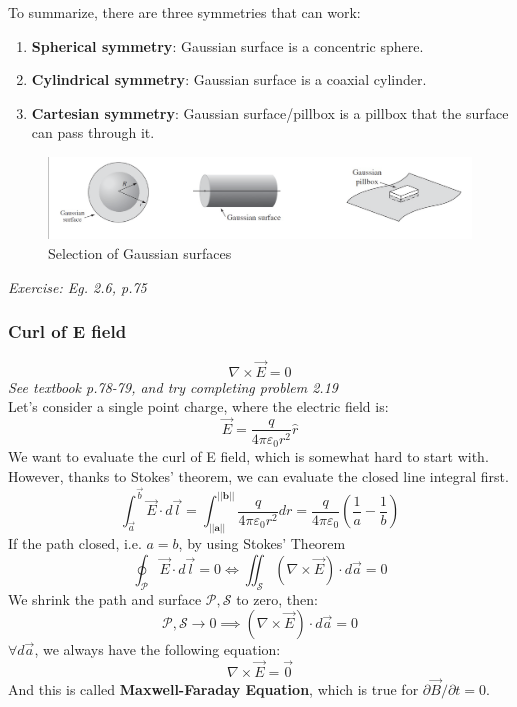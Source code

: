 \documentclass[12pt,a4paper,twoside]{article}
\numberwithin{equation}{section}
\begin{document}
    To summarize, there are three symmetries that can work:
    \begin{enumerate}
        \item \textbf{Spherical symmetry}: Gaussian surface is a concentric sphere.
        \item \textbf{Cylindrical symmetry}: Gaussian surface is a coaxial cylinder.
        \item \textbf{Cartesian symmetry}: Gaussian surface/pillbox is a pillbox that the surface can pass through it.
    \end{enumerate}
    \begin{figure}[ht]
        \centering
        \includegraphics[width=15cm]{250-Revision/gaussian-surfaces.png}
        \caption{Selection of Gaussian surfaces}
        \label{fig:gaussian-surfaces}
    \end{figure}
    \textit{Exercise: Eg. 2.6, p.75}
    
\subsubsection{Curl of E field}
    \[\nabla \times \overrightarrow{E}=0\]
    \textit{See textbook p.78-79, and try completing problem 2.19}\\
    Let's consider a single point charge, where the electric field is:
    \[\overrightarrow{E}=\frac{q}{4\pi\varepsilon_0r^2}\hat{r}\]
    We want to evaluate the curl of E field, which is somewhat hard to start with. However, thanks to Stokes' theorem, we can evaluate the closed line integral first.
    \[\int_{\overrightarrow{a}}^{\overrightarrow{b}}\overrightarrow{E}\cdot d\overrightarrow{l}=\int_{||\mathbf{a}||}^{||\mathbf{b}||}\frac{q}{4\pi\varepsilon_0 r^2}dr=\frac{q}{4\pi\varepsilon_0}\left(\frac{1}{a}-\frac{1}{b}\right)\]
    If the path closed, i.e. $a=b$, by using Stokes' Theorem
    \[\oint_{\mathcal{P}}\overrightarrow{E}\cdot d\overrightarrow{l}=0\iff \iint_{\mathcal{S}}(\nabla\times \overrightarrow{E})\cdot d\overrightarrow{a}=0\]
    We shrink the path and surface $\mathcal{P}, \mathcal{S}$ to zero, then:
    \[\mathcal{P},\mathcal{S}\to 0\implies (\nabla \times \overrightarrow{E})\cdot d\overrightarrow{a}=0\]
    $\forall d\overrightarrow{a}$,  we always have the following equation:
    \begin{equation}
        \nabla \times \overrightarrow{E} = \overrightarrow{0}
        \label{eq: Maxwell-Faraday equation}
    \end{equation}
    And this is called \textbf{Maxwell-Faraday Equation}, which is true for $\partial \overrightarrow{B}/\partial t=0$.
\end{document}
